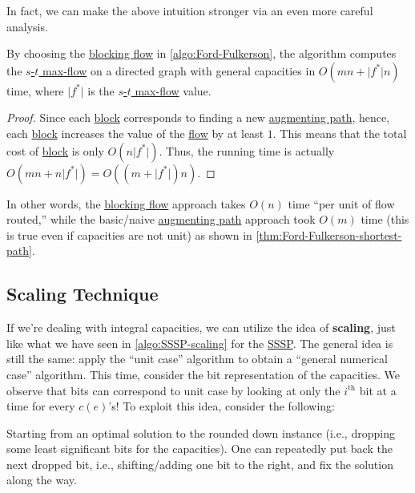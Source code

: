In fact, we can make the above intuition stronger via an even more careful analysis.

\begin{corollary}\label{col:Ford-Fulkerson-blocking-flow-general}
	By choosing the \hyperref[def:blocking-flow]{blocking flow} in \autoref{algo:Ford-Fulkerson}, the algorithm computes the \hyperref[prb:s-t-max-flow]{\(s\)-\(t\) max-flow} on a directed graph with general capacities in \(O(mn + \lvert f^{\ast} \rvert n)\) time, where \(\lvert f^{\ast} \rvert \) is the \hyperref[prb:s-t-max-flow]{\(s\)-\(t\) max-flow} value.
\end{corollary}
\begin{proof}
	Since each \hyperref[algo:general-adaptive-DFS-block]{block} corresponds to finding a new \hyperref[def:augmenting-path]{augmenting path}, hence, each \hyperref[algo:general-adaptive-DFS-block]{block} increases the value of the \hyperref[def:flow]{flow} by at least \(1\). This means that the total cost of \hyperref[algo:general-adaptive-DFS-block]{block} is only \(O(n \lvert f^{\ast} \rvert )\). Thus, the running time is actually \(O(mn + n \lvert f^{\ast} \rvert ) = O((m + \lvert f^{\ast} \rvert) n)\).
\end{proof}

In other words, the \hyperref[def:blocking-flow]{blocking flow} approach takes \(O(n)\) time ``per unit of flow routed,'' while the basic/naive \hyperref[def:augmenting-path]{augmenting path} approach took \(O(m)\) time (this is true even if capacities are not unit) as shown in \autoref{thm:Ford-Fulkerson-shortest-path}.

\subsection{Scaling Technique}
If we're dealing with integral capacities, we can utilize the idea of \textbf{scaling}, just like what we have seen in \autoref{algo:SSSP-scaling} for the \hyperref[prb:SSSP]{SSSP}. The general idea is still the same: apply the ``unit case'' algorithm to obtain a ``general numerical case'' algorithm. This time, consider the bit representation of the capacities. We observe that bits can correspond to unit case by looking at only the \(i^{\text{th} }\) bit at a time for every \(c(e)\)'s! To exploit this idea, consider the following:

\begin{intuition}
	Starting from an optimal solution to the rounded down instance (i.e., dropping some least significant bits for the capacities). One can repeatedly put back the next dropped bit, i.e., shifting/adding one bit to the right, and fix the solution along the way.
\end{intuition}

